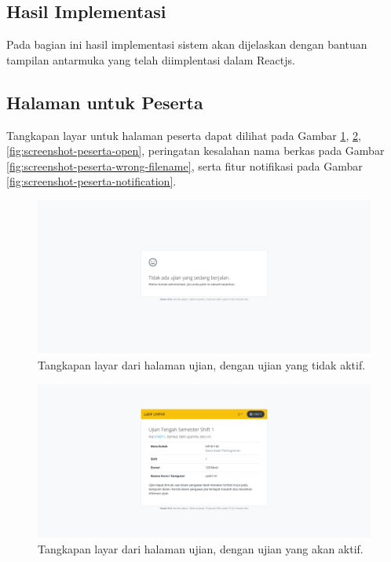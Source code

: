 \subsection{Hasil Implementasi}
    Pada bagian ini hasil implementasi sistem akan dijelaskan dengan bantuan tampilan antarmuka yang telah
    diimplentasi dalam Reactjs.
    
    \subsection{Halaman untuk Peserta}
        Tangkapan layar untuk halaman peserta dapat dilihat pada Gambar \ref{fig:screenshot-peserta-blankstate},
        \ref{fig:screenshot-peserta-standby}, \ref{fig:screenshot-peserta-open}, peringatan kesalahan
        nama berkas pada Gambar \ref{fig:screenshot-peserta-wrong-filename}, serta fitur notifikasi pada Gambar
        \ref{fig:screenshot-peserta-notification}.
        
        \begin{figure}
            \centering
            \includegraphics[width=0.7\paperwidth]{Gambar/implemented-interface/peserta/exam-empty.png}
            \caption{Tangkapan layar dari halaman ujian, dengan ujian yang tidak aktif.}
            \label{fig:screenshot-peserta-blankstate}
        \end{figure}
        
        \begin{figure}
            \centering
            \includegraphics[width=0.7\paperwidth]{Gambar/implemented-interface/peserta/exam-standby.png}
            \caption{Tangkapan layar dari halaman ujian, dengan ujian yang akan aktif.}
            \label{fig:screenshot-peserta-standby}
        \end{figure}
        
